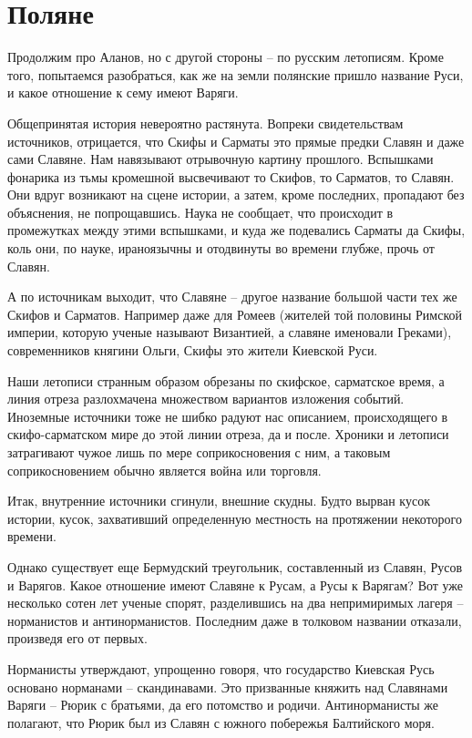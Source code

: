 \chapter{Поляне}

Продолжим про Аланов, но с другой стороны – по русским летописям. Кроме того, попытаемся разобраться, как же на земли полянские пришло название Руси, и какое отношение к сему имеют Варяги.

Общепринятая история невероятно растянута. Вопреки свидетельствам источников, отрицается, что Скифы и Сарматы это прямые предки Славян и даже сами Славяне. Нам навязывают отрывочную картину прошлого. Вспышками фонарика из тьмы кромешной высвечивают то Скифов, то Сарматов, то Славян. Они вдруг возникают на сцене истории, а затем, кроме последних, пропадают без объяснения, не попрощавшись. Наука не сообщает, что происходит в промежутках между этими вспышками, и куда же подевались Сарматы да Скифы, коль они, по науке, ираноязычны и отодвинуты во времени глубже, прочь от Славян.

А по источникам выходит, что Славяне – другое название большой части тех же Скифов и Сарматов. Например даже для Ромеев (жителей той половины Римской империи, которую ученые называют Византией, а славяне именовали Греками), современников княгини Ольги, Скифы это жители Киевской Руси.

Наши летописи странным образом обрезаны по скифское, сарматское время, а линия отреза разлохмачена множеством вариантов изложения событий. Иноземные источники тоже не шибко радуют нас описанием, происходящего в скифо-сарматском мире до этой линии отреза, да и после. Хроники и летописи затрагивают чужое лишь по мере соприкосновения с ним, а таковым соприкосновением обычно является война или торговля.

Итак, внутренние источники сгинули, внешние скудны. Будто вырван кусок истории, кусок, захвативший определенную местность на протяжении некоторого времени.

Однако существует еще Бермудский треугольник, составленный из Славян, Русов и Варягов. Какое отношение имеют Славяне к Русам, а Русы к Варягам? Вот уже несколько сотен лет ученые спорят, разделившись на два непримиримых лагеря – норманистов и антинорманистов. Последним даже в толковом названии отказали, произведя его от первых.

Норманисты утверждают, упрощенно говоря, что государство Киевская Русь основано норманами – скандинавами. Это призванные княжить над Славянами Варяги – Рюрик с братьями, да его потомство и родичи. Антинорманисты же полагают, что Рюрик был из Славян с южного побережья Балтийского моря.


